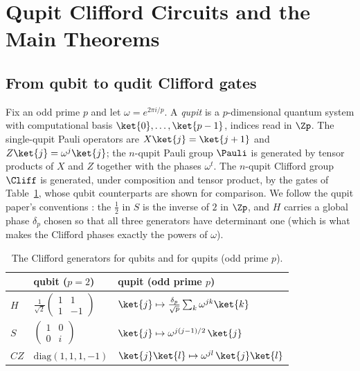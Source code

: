 \section{Qupit Clifford Circuits and the Main Theorems}\label{sec:background}

\subsection{From qubit to qudit Clifford gates}

Fix an odd prime $p$ and let $\omega = e^{2\pi i/p}$.  A \emph{qupit} is
a $p$-dimensional quantum system with computational basis
$\ket{0},\dots,\ket{p-1}$, indices read in $\Zp$.  The single-qupit Pauli
operators are $X\ket{j} = \ket{j+1}$ and $Z\ket{j} = \omega^{j}\ket{j}$;
the $n$-qupit Pauli group $\Pauli$ is generated by tensor products of $X$
and $Z$ together with the phases $\omega^t$.  The $n$-qupit Clifford
group $\Cliff$ is generated, under composition and tensor product, by the
gates of Table~\ref{tab:gates}, whose qubit counterparts are shown for
comparison.  We follow the qupit paper's conventions
\cite{bian2026qudit}: the $\tfrac12$ in $S$ is the inverse of $2$ in
$\Zp$, and $H$ carries a global phase $\delta_p$ chosen so that all three
generators have determinant one (which is what makes the Clifford phases
exactly the powers of $\omega$).

\begin{table}[h]
\caption{The Clifford generators for qubits and for qupits (odd prime $p$).}
\label{tab:gates}
\centering
\begin{tabular}{lll}
\toprule
 & qubit ($p = 2$) & qupit (odd prime $p$) \\
\midrule
$H$  & $\frac{1}{\sqrt2}\begin{pmatrix}1&1\\1&-1\end{pmatrix}$
     & $\ket{j} \mapsto \tfrac{\delta_p}{\sqrt p}\sum_k \omega^{jk}\ket{k}$ \\[2ex]
$S$  & $\begin{pmatrix}1&0\\0&i\end{pmatrix}$
     & $\ket{j} \mapsto \omega^{j(j-1)/2}\,\ket{j}$ \\[2ex]
$CZ$ & $\mathrm{diag}(1,1,1,-1)$
     & $\ket{j}\ket{l} \mapsto \omega^{jl}\,\ket{j}\ket{l}$ \\
\bottomrule
\end{tabular}
\end{table}

